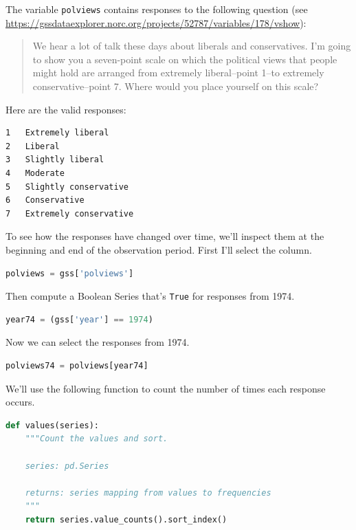 The variable \passthrough{\lstinline!polviews!} contains responses to
the following question (see
\url{https://gssdataexplorer.norc.org/projects/52787/variables/178/vshow}):

\begin{quote}
We hear a lot of talk these days about liberals and conservatives. I'm
going to show you a seven-point scale on which the political views that
people might hold are arranged from extremely liberal--point 1--to
extremely conservative--point 7. Where would you place yourself on this
scale?
\end{quote}

Here are the valid responses:

\begin{lstlisting}[style=output]
1   Extremely liberal
2   Liberal
3   Slightly liberal
4   Moderate
5   Slightly conservative
6   Conservative
7   Extremely conservative
\end{lstlisting}

To see how the responses have changed over time, we'll inspect them at
the beginning and end of the observation period. First I'll select the
column.

\begin{lstlisting}[language=Python,style=source]
polviews = gss['polviews']
\end{lstlisting}

Then compute a Boolean Series that's \passthrough{\lstinline!True!} for
responses from 1974.

\begin{lstlisting}[language=Python,style=source]
year74 = (gss['year'] == 1974)
\end{lstlisting}

Now we can select the responses from 1974.

\begin{lstlisting}[language=Python,style=source]
polviews74 = polviews[year74]
\end{lstlisting}

We'll use the following function to count the number of times each
response occurs.

\begin{lstlisting}[language=Python,style=source]
def values(series):
    """Count the values and sort.
    
    series: pd.Series
    
    returns: series mapping from values to frequencies
    """
    return series.value_counts().sort_index()
\end{lstlisting}

